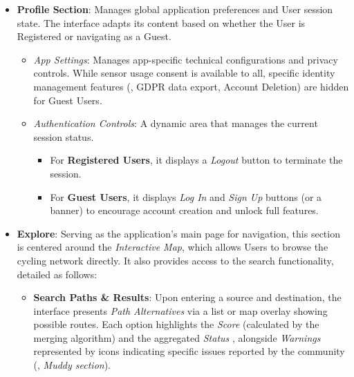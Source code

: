 \begin{itemize}
    \item \textbf{Profile Section}: 
    Manages global application preferences and User session state. The interface adapts its content based on whether the User is Registered or navigating as a Guest.
    \begin{itemize}
        \item \emph{App Settings}: Manages app-specific technical configurations and privacy controls. While sensor usage consent is available to all, specific identity management features (\eg, GDPR data export, Account Deletion) are hidden for Guest Users.
        \item \emph{Authentication Controls}: A dynamic area that manages the current session status.
        \begin{itemize}
            \item For \textbf{Registered Users}, it displays a \emph{Logout} button to terminate the session.
            \item For \textbf{Guest Users}, it displays \emph{Log In} and \emph{Sign Up} buttons (or a banner) to encourage account creation and unlock full features.
        \end{itemize}
    \end{itemize}
    
    \item \textbf{Explore}: Serving as the application's main page for navigation, this section is centered around the \emph{Interactive Map}, which allows Users to browse the cycling network directly. It also provides access to the search functionality, detailed as follows:
    \begin{itemize}
        \item \textbf{Search Paths \& Results}: Upon entering a source and destination, the interface presents \emph{Path Alternatives} via a list or map overlay showing possible routes. Each option highlights the \emph{Score} (calculated by the merging algorithm) and the aggregated \emph{Status} , alongside \emph{Warnings} represented by icons indicating specific issues reported by the community (\eg, \emph{Muddy section}).
    \end{itemize}


\end{itemize}
